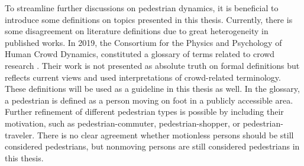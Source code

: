 \documentclass[class=article, crop=false]{standalone}
\begin{document}
To streamline further discussions on pedestrian dynamics, it is beneficial to introduce some definitions on topics presented in this thesis. 
Currently, there is some disagreement on literature definitions due to great heterogeneity in published works. In 2019, the Consortium for the Physics and Psychology of Human Crowd Dynamics, constituted a glossary of terms related to crowd research \cite{glossary_for_pedestrian}. Their work is not presented as absolute truth on formal definitions but reflects current views and used interpretations of crowd-related terminology. These definitions will be used as a guideline in this thesis as well. In the glossary, a pedestrian is defined as a person moving on foot in a publicly accessible area. Further refinement of different pedestrian types is possible by including their motivation, such as pedestrian-commuter, pedestrian-shopper, or pedestrian-traveler. There is no clear agreement whether motionless persons should be still considered pedestrians, but nonmoving persons are still considered pedestrians in this thesis.
\end{document}
